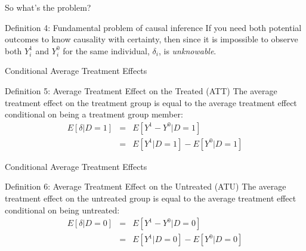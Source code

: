 \documentclass{beamer}
\begin{document}
\begin{frame}{So what's the problem?}

	\begin{block}{Definition 4: Fundamental problem of causal inference}	
	If you need both potential outcomes to know causality with certainty, then since it is impossible to observe both $Y_i^1$ and $Y_i^0$ for the same individual, $\delta_i$, is \emph{unknowable}.
	\end{block}

\end{frame}


\begin{frame}{Conditional Average Treatment Effects}	
	\begin{block}{Definition 5: Average Treatment Effect on the Treated (ATT)}
	The average treatment effect on the treatment group is equal to the average treatment effect conditional on being a treatment group member:
		\begin{eqnarray*}
		E[\delta|D=1]&=&E[Y^1-Y^0|D=1] \nonumber \\
		&=&E[Y^1|D=1]-E[Y^0|D=1]
		\end{eqnarray*}
	\end{block}
\end{frame}

\begin{frame}{Conditional Average Treatment Effects}
	\begin{block}{Definition 6: Average Treatment Effect on the Untreated (ATU)}
	The average treatment effect on the untreated group is equal to the average treatment effect conditional on being untreated:
		\begin{eqnarray*}
		E[\delta|D=0]&=&E[Y^1-Y^0|D=0] \nonumber \\
		&=&E[Y^1|D=0]-E[Y^0|D=0]
		\end{eqnarray*}
	\end{block}

\end{frame}
\end{document}
